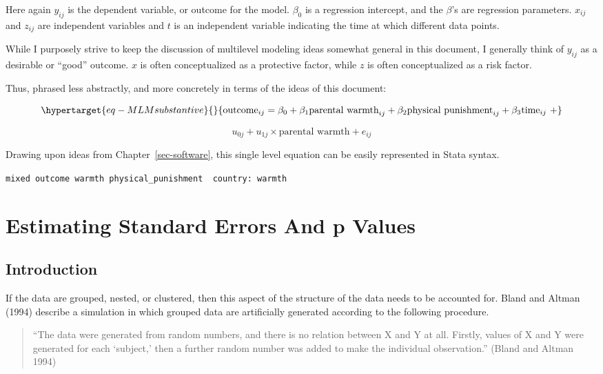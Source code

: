 \documentclass[
  letterpaper,
  DIV=11,
  numbers=noendperiod]{scrreprt}
\begin{document}
Here again \(y_{ij}\) is the dependent variable, or outcome for the
model. \(\beta_0\) is a regression intercept, and the \(\beta\)'s are
regression parameters. \(x_{ij}\) and \(z_{ij}\) are independent
variables and \(t\) is an independent variable indicating the time at
which different data points.

While I purposely strive to keep the discussion of multilevel modeling
ideas somewhat general in this document, I generally think of \(y_{ij}\)
as a desirable or ``good'' outcome. \(x\) is often conceptualized as a
protective factor, while \(z\) is often conceptualized as a risk factor.

Thus, phrased less abstractly, and more concretely in terms of the ideas
of this document:

\begin{equation}\protect\hypertarget{eq-MLMsubstantive}{}{\text{outcome}_{ij} = \beta_0 + \beta_1 \text{parental warmth}_{ij} + \beta_2 \text{physical punishment}_{ij} + \beta_3 \text{time}_{ij} \ + }\label{eq-MLMsubstantive}\end{equation}

\[u_{0j} + u_{1j} \times \text{parental warmth} + e_{ij}\]

Drawing upon ideas from Chapter~\ref{sec-software}, this single level
equation can be easily represented in Stata syntax.

\texttt{mixed\ outcome\ warmth\ physical\_punishment\ \textbar{}\textbar{}\ country:\ warmth}

\hypertarget{sec-pvalues}{%
\section{Estimating Standard Errors And p Values}\label{sec-pvalues}}

\hypertarget{introduction-1}{%
\subsection{Introduction}\label{introduction-1}}

If the data are grouped, nested, or clustered, then this aspect of the
structure of the data needs to be accounted for. Bland and Altman (1994)
describe a simulation in which grouped data are artificially generated
according to the following procedure.

\begin{quote}
``The data were generated from random numbers, and there is no relation
between X and Y at all. Firstly, values of X and Y were generated for
each `subject,' then a further random number was added to make the
individual observation.'' (Bland and Altman 1994)
\end{quote}
\end{document}
